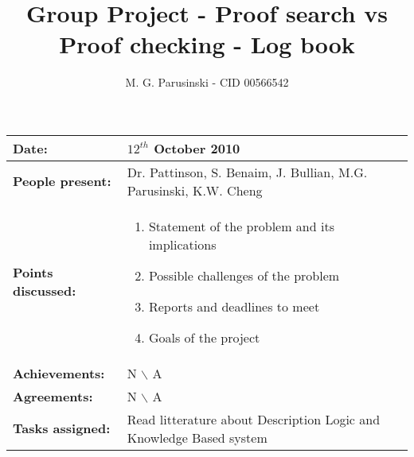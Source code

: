 \documentclass[12pt,a4paper]{article}
\title{Group Project - Proof search vs Proof checking - Log book}
\author{M. G. Parusinski - CID 00566542}
\newcommand{\meeting}[6]{%
\begin{center}%
\begin{longtable}{| p{3.5cm} | | p{13cm} |}%
\hline%
\textbf{Date:} & #1 \\%
\hline%
\textbf{People present:} &#2 \\%
\hline%
\textbf{Points discussed:} &#3\\%
\hline%
\textbf{Achievements:} &#4 \\%
\hline%
\textbf{Agreements:} &#5 \\%
\hline%
\textbf{Tasks assigned:} &#6  \\%
\hline%
\end{longtable}%
\end{center}%
\bigbreak
}
\begin{document}
\maketitle

\meeting{$12^{th}$ October 2010}%
{Dr. Pattinson, S. Benaim, J. Bullian, M.G. Parusinski, K.W. Cheng}%
{ \begin{enumerate} \item Statement of the problem and its implications 
 \item Possible challenges of the problem 
 \item Reports and deadlines to meet 
 \item Goals of the project 
\end{enumerate} }%
{ N $\backslash$ A}%
{ N $\backslash$ A}%
{ Read litterature about Description Logic and Knowledge Based system}
\end{document}
